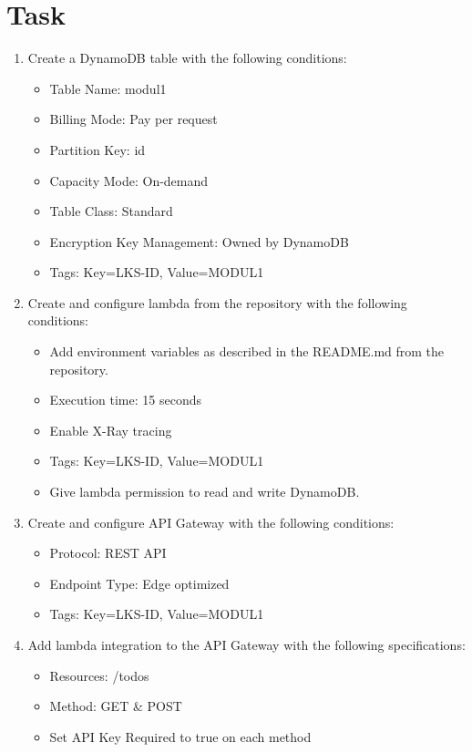 \documentclass{article}
\begin{document}
\section{Task}
\begin{enumerate}
  \item Create a DynamoDB table with the following conditions:
  \begin{itemize}
      \item Table Name: modul1
      \item Billing Mode: Pay per request
      \item Partition Key: id
      \item Capacity Mode: On-demand
      \item Table Class: Standard
      \item Encryption Key Management: Owned by DynamoDB
      \item Tags: Key=LKS-ID, Value=MODUL1
  \end{itemize}
  \item Create and configure lambda from the repository with the following conditions:
  \begin{itemize}
      \item Add environment variables as described in the README.md from the repository.
      \item Execution time: 15 seconds
      \item Enable X-Ray tracing
      \item Tags: Key=LKS-ID, Value=MODUL1
      \item Give lambda permission to read and write DynamoDB.
  \end{itemize}
  \item Create and configure API Gateway with the following conditions:
  \begin{itemize}
      \item Protocol: REST API
      \item Endpoint Type: Edge optimized
      \item Tags: Key=LKS-ID, Value=MODUL1
  \end{itemize}
  \item Add lambda integration to the API Gateway with the following specifications:
  \begin{itemize}
      \item Resources: /todos
      \item Method: GET \& POST
      \item Set API Key Required to true on each method
  \end{itemize}

\end{enumerate}
\end{document}
